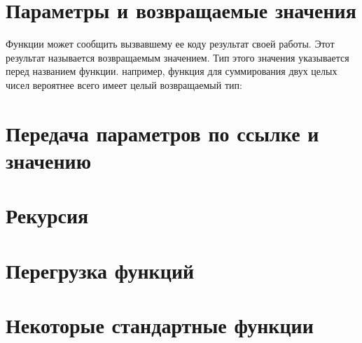 \documentclass[book.tex]{subfiles}
\begin{document}
\section*{Параметры и возвращаемые значения}

Функции может сообщить вызвавшему ее коду результат своей работы. Этот результат называется возвращаемым значением. Тип этого значения указывается перед названием функции. например, функция для суммирования двух целых чисел вероятнее всего имеет целый возвращаемый тип:


\section*{Передача параметров по ссылке и значению}

\section*{Рекурсия}

\section*{Перегрузка функций}

\section*{Некоторые стандартные функции}
\end{document}
